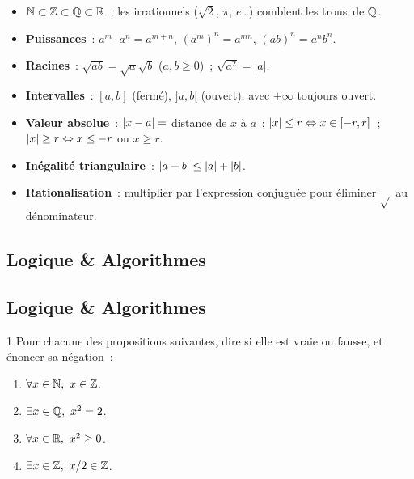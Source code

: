 \begin{bilan}
\begin{itemize}
  \item $\mathbb{N} \subset \mathbb{Z} \subset \mathbb{Q} \subset \mathbb{R}$~; les irrationnels
        ($\sqrt{2}$, $\pi$, $e$\ldots) comblent les \og trous\fg\ de $\mathbb{Q}$.
  \item \textbf{Puissances}~: $a^m\cdot a^n = a^{m+n}$,\;
        $(a^m)^n = a^{mn}$,\; $(ab)^n = a^nb^n$.
  \item \textbf{Racines}~: $\sqrt{ab}=\sqrt{a}\sqrt{b}$ ($a,b\geq0$)~;
        $\sqrt{a^2}=|a|$.
  \item \textbf{Intervalles}~: $[a,b]$ (ferm\'e), $]a,b[$ (ouvert),
        avec $\pm\infty$ toujours ouvert.
  \item \textbf{Valeur absolue}~: $\left|x-a\right|=$ distance de $x$ \`a $a$~;
        $\left|x\right|\leq r \Leftrightarrow x\in[-r,r]$~;
        $\left|x\right|\geq r \Leftrightarrow x\leq-r$ ou $x\geq r$.
  \item \textbf{In\'egalit\'e triangulaire}~:
        $\left|a+b\right|\leq\left|a\right|+\left|b\right|$.
  \item \textbf{Rationalisation}~:
        multiplier par l'expression conjugu\'ee pour \'eliminer $\sqrt{}$
        au d\'enominateur.
\end{itemize}

\subsection*{Logique \& Algorithmes}

\subsection*{Logique \& Algorithmes}

\begin{exo}{1}
Pour chacune des propositions suivantes, dire si elle est vraie ou fausse,
et \'enoncer sa n\'egation~:
\begin{enumerate}
  \item $\forall x\in\N,\ x\in\Z$.\quad
  \item $\exists x\in\Q,\ x^2=2$.\quad
  \item $\forall x\in\R,\ x^2\geq0$.\quad
  \item $\exists x\in\Z,\ x/2\in\Z$.
\end{enumerate}
\end{exo}


\end{bilan}
